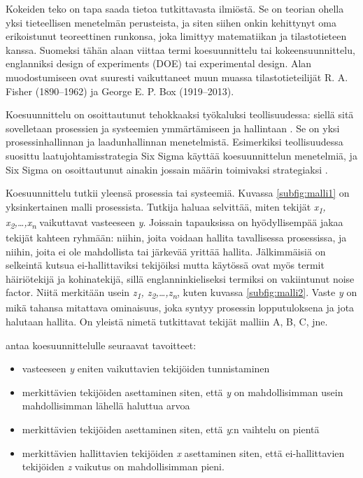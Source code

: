 \documentclass[12pt,a4paper,finnish]{tutthesis}
\begin{document}
Kokeiden teko on tapa saada tietoa tutkittavasta ilmiöstä. Se on teorian
ohella yksi tieteellisen menetelmän perusteista, ja siten siihen onkin
kehittynyt oma erikoistunut teoreettinen runkonsa, joka limittyy matematiikan ja
tilastotieteen kanssa.
Suomeksi tähän alaan viittaa termi koesuunnittelu tai kokeensuunnittelu,
englanniksi design of experiments (DOE) tai experimental design.
Alan muodostumiseen ovat suuresti vaikuttaneet muun muassa
tilastotieteilijät R. A. Fisher (1890--1962) ja George E. P. Box (1919--2013).

Koesuunnittelu on osoittautunut tehokkaaksi työkaluksi teollisuudessa: siellä sitä
sovelletaan prosessien
ja systeemien ymmärtämiseen ja hallintaan \parencite{Antony2006} . Se on yksi prosessinhallinnan
ja laadunhallinnan menetelmistä. Esimerkiksi teollisuudessa suosittu laatujohtamisstrategia
Six Sigma käyttää koesuunnittelun menetelmiä, ja Six Sigma on osoittautunut
ainakin jossain määrin
toimivaksi strategiaksi \parencite{Dusharme2001}.

Koesuunnittelu tutkii yleensä prosessia tai systeemiä. Kuvassa \ref{subfig:malli1}
on yksinkertainen malli prosessista. Tutkija haluaa selvittää, miten tekijät
\textit{x\textsubscript{1}, x\textsubscript{2},\ldots,x\textsubscript{n}}
vaikuttavat vasteeseen \textit{y}.
Joissain tapauksissa on hyödyllisempää
jakaa tekijät kahteen ryhmään: niihin, joita voidaan hallita tavallisessa
prosessissa, ja niihin, joita ei ole mahdollista tai järkevää yrittää
hallita. Jälkimmäisiä on selkeintä kutsua ei-hallittaviksi tekijöiksi
mutta käytössä ovat myös termit häiriötekijä ja kohinatekijä, sillä englanninkieliseksi
termiksi on vakiintunut noise factor.
Niitä merkitään usein
\textit{z\textsubscript{1}, z\textsubscript{2},\ldots,z\textsubscript{n}}, kuten
kuvassa \ref{subfig:malli2}.
Vaste \textit{y} on mikä tahansa mitattava ominaisuus, joka syntyy prosessin
lopputuloksena ja jota halutaan hallita.
On yleistä nimetä tutkittavat tekijät malliin A, B, C, jne.

\textcite[s.~3]{Montgomery2012} antaa koesuunnittelulle
seuraavat tavoitteet:

\begin{itemize}
\item vasteeseen \textit{y} eniten vaikuttavien tekijöiden tunnistaminen
\item merkittävien tekijöiden asettaminen siten, että \textit{y} on mahdollisimman usein
	mahdollisimman lähellä haluttua arvoa
\item merkittävien tekijöiden asettaminen siten, että \textit{y}:n vaihtelu on pientä
\item merkittävien hallittavien tekijöiden \textit{x} asettaminen siten, että
	ei-hallittavien tekijöiden \textit{z} vaikutus on mahdollisimman pieni.
\end{itemize}
\end{document}
